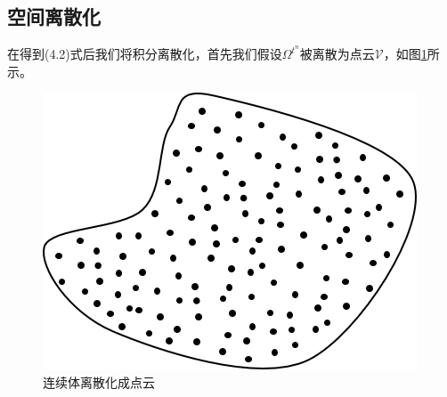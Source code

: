 \subsection{空间离散化}
在得到(4.2)式后我们将积分离散化，首先我们假设$\Omega^{t^n}$被离散为点云$\mathcal{V}$，如图\ref{fig: discretise continuum}所示。
\begin{figure}[htbp]
    \centering
    \includegraphics[scale=0.8]{./images/image11.png}
    \caption{连续体离散化成点云}
    \label{fig: discretise continuum}
\end{figure}

